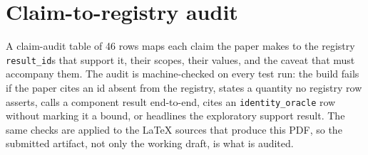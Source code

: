 \section{Claim-to-registry audit}
\label{ssec:audit}

A claim-audit table of 46 rows maps each claim the paper makes to the
registry \texttt{result\_id}s that support it, their scopes, their values,
and the caveat that must accompany them. The audit is machine-checked on
every test run: the build fails if the paper cites an id absent from the
registry, states a quantity no registry row asserts, calls a component
result end-to-end, cites an \texttt{identity\_oracle} row without marking it
a bound, or headlines the exploratory support result. The same checks are
applied to the \LaTeX{} sources that produce this PDF, so the submitted
artifact, not only the working draft, is what is audited.
